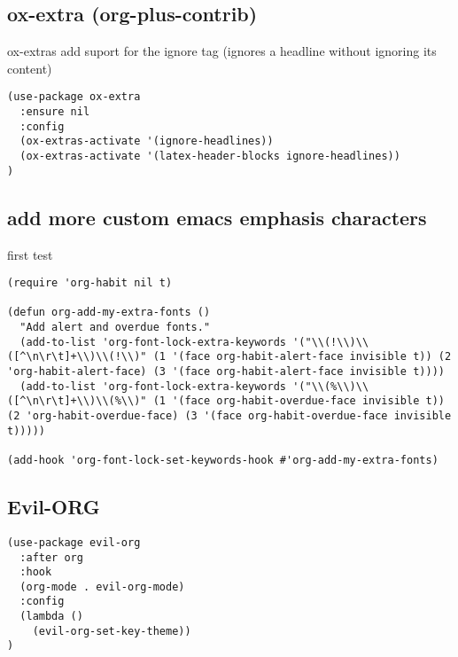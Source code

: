 \documentclass[11pt]{article}
\begin{document}
\subsection*{ox-extra (org-plus-contrib)}
\label{sec:org55493a6}

ox-extras
add suport for the ignore tag (ignores a headline without ignoring its content)

\begin{verbatim}
(use-package ox-extra
  :ensure nil
  :config
  (ox-extras-activate '(ignore-headlines))
  (ox-extras-activate '(latex-header-blocks ignore-headlines))
)
\end{verbatim}

\subsection*{add more custom emacs emphasis characters}
\label{sec:org9a8e811}


first test
\begin{verbatim}
(require 'org-habit nil t)

(defun org-add-my-extra-fonts ()
  "Add alert and overdue fonts."
  (add-to-list 'org-font-lock-extra-keywords '("\\(!\\)\\([^\n\r\t]+\\)\\(!\\)" (1 '(face org-habit-alert-face invisible t)) (2 'org-habit-alert-face) (3 '(face org-habit-alert-face invisible t))))
  (add-to-list 'org-font-lock-extra-keywords '("\\(%\\)\\([^\n\r\t]+\\)\\(%\\)" (1 '(face org-habit-overdue-face invisible t)) (2 'org-habit-overdue-face) (3 '(face org-habit-overdue-face invisible t)))))

(add-hook 'org-font-lock-set-keywords-hook #'org-add-my-extra-fonts)
\end{verbatim}


\subsection*{Evil-ORG}
\label{sec:orgc0b7878}

\begin{verbatim}
(use-package evil-org
  :after org
  :hook
  (org-mode . evil-org-mode)
  :config
  (lambda ()
    (evil-org-set-key-theme))
)
\end{verbatim}
\end{document}

